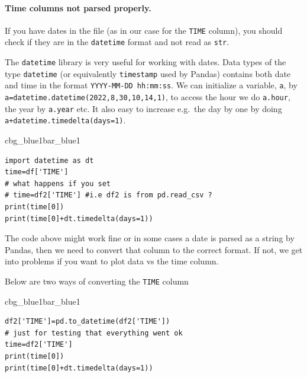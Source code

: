 \documentclass[%
oneside,                 %
final,                   %
10pt]{article}
\newenvironment{_pro_tight}[2]{
   \def\FrameCommand{\color{#2}\vrule width 1mm\normalcolor\colorbox{#1}}
   \FrameRule0.6pt\MakeFramed {\advance\hsize-2mm\FrameRestore}\vskip3mm}
   {\vskip0mm\endMakeFramed}
\newenvironment{pro}[2]{
\bgroup\rmfamily
\fboxsep=0mm\relax
\begin{_pro_tight}{#1}{#2}
\list{}{\parsep=-2mm\parskip=0mm\topsep=0pt\leftmargin=2mm
\rightmargin=2\leftmargin\leftmargin=4pt\relax}
\item\relax}
{\endlist\end{_pro_tight}\egroup}
\newenvironment{notice_mdfboxadmon}[1][]{
\begin{notice_mdfboxmdframed}[frametitle=#1]
}
{
\end{notice_mdfboxmdframed}
}
\begin{document}
\paragraph{Time columns not parsed properly.}
If you have dates in the file (as in our case for the \texttt{TIME} column), you should check if they are in the \texttt{datetime} format and not read as \texttt{str}.


\begin{notice_mdfboxadmon}
The \texttt{datetime} library is very useful for working with dates. Data types of the type \texttt{datetime} (or equivalently \texttt{timestamp} used by Pandas) contains both date and time in the format \texttt{YYYY-MM-DD hh:mm:ss}. We can initialize a variable, \texttt{a}, by \texttt{a=datetime.datetime(2022,8,30,10,14,1)}, to access the hour we do \texttt{a.hour}, the year by \texttt{a.year} etc. It also easy to increase e.g.~the day by one by doing \texttt{a+datetime.timedelta(days=1)}.
\end{notice_mdfboxadmon} %










\begin{pro}{cbg_blue1}{bar_blue1}\begin{Verbatim}[numbers=none,fontsize=\fontsize{9pt}{9pt},baselinestretch=0.95,xleftmargin=2mm]
import datetime as dt
time=df['TIME']
# what happens if you set
# time=df2['TIME'] #i.e df2 is from pd.read_csv ?
print(time[0])
print(time[0]+dt.timedelta(days=1))

\end{Verbatim}
\end{pro}
\noindent


The code above might work fine or in some cases a date is parsed as a string by Pandas, then we need to convert that column to the correct format. If not, we get into problems if you want to plot data vs the time column.

Below are two ways of converting the \texttt{TIME} column






\begin{pro}{cbg_blue1}{bar_blue1}\begin{Verbatim}[numbers=none,fontsize=\fontsize{9pt}{9pt},baselinestretch=0.95,xleftmargin=2mm]
df2['TIME']=pd.to_datetime(df2['TIME'])
# just for testing that everything went ok
time=df2['TIME']
print(time[0])
print(time[0]+dt.timedelta(days=1))

\end{Verbatim}
\end{pro}
\noindent
\end{document}
